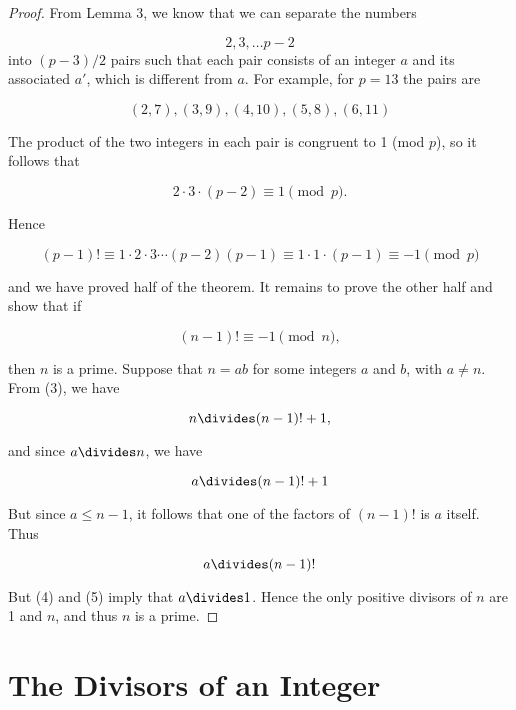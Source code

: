 \documentclass{article}
\theoremstyle{definition} %
\theoremstyle{definition}
\theoremstyle{definition}
\theoremstyle{definition}
\begin{document}
  \begin{proof}
    From Lemma 3, we know that we can separate the numbers
    
    \[ 2, 3, \dots p - 2 \]
    into $(p - 3) / 2$ pairs such that each pair consists of an integer
    $a$ and its associated $a'$, which is different from $a$. For example,
    for $p = 13$ the pairs are
    
    \[ (2, 7), (3, 9), (4, 10), (5, 8), (6, 11) \]
    
    The product of the two integers in each pair is congruent to 1 (mod $p$),
    so it follows that
    
    \[ 2 \cdot 3 \cdot (p - 2) \equiv 1 \pmod{p}. \]
    
    Hence
    
    \[ (p - 1)! \equiv 1 \cdot 2 \cdot 3 \cdots (p - 2)(p-1) \equiv 1 \cdot 1 \cdot (p - 1) \equiv -1 \pmod{p} \]
    
    and we have proved half of the theorem. It remains to prove the other half and show that if
    
    \begin{equation}
      (n - 1)! \equiv -1 \pmod{n},
    \end{equation}
    
    then $n$ is a prime. Suppose that $n = ab$ for some integers $a$ and $b$, with $a \neq n$. From (3), we have
    
    \[ n \divides (n - 1)! + 1, \]
    
    and since $a \divides n$, we have
    
    \begin{equation}
      a \divides (n - 1)! + 1
    \end{equation}
    
    But since $a \leq n - 1$, it follows that one of the factors of $(n - 1)!$ is $a$ itself. Thus
    
    \begin{equation}
      a \divides (n - 1)!
    \end{equation}
    
    But (4) and (5) imply that $a \divides 1$. Hence the only positive divisors of $n$ are 1 and
    $n$, and thus $n$ is a prime.
  \end{proof}
  
  \section{The Divisors of an Integer}
  
\end{document}
